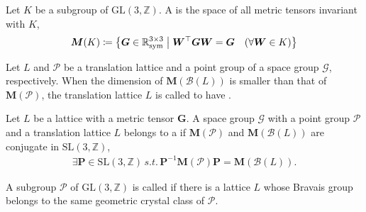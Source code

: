 \begin{screen}
  \begin{defn}
    Let $K$ be a subgroup of $\mathrm{GL}(3, \mathbb{Z})$.
    A  is the space of all metric tensors invariant with $K$,
    \begin{align}
      \bm{M}( K ) \coloneqq \left\{  \bm{G} \in \mathbb{R}^{3 \times 3}_{\mathrm{sym}}  \mathrel{}\middle|\mathrel{}  \bm{W}^{\top}\bm{G}\bm{W} = \bm{G} \quad (\forall \bm{W} \in K )  \right\}
    \end{align}
  \end{defn}
\end{screen}

Let $L$ and $\mathcal{P}$ be a translation lattice and a point group of a space group $\mathcal{G}$, respectively.
When the dimension of $\bm{M}(\mathcal{B}(L))$ is smaller than that of $\bm{M}(\mathcal{P})$, the translation lattice $L$ is called to have .


\begin{screen}
  \begin{defn}
    Let $L$ be a lattice with a metric tensor $\bm{G}$.
    A space group $\mathcal{G}$ with a point group $\mathcal{P}$ and a translation lattice $L$ belongs to a  if $\bm{M}(\mathcal{P})$ and $\bm{M}(\mathcal{B}(L))$ are conjugate in $\mathrm{SL}(3, \mathbb{Z})$,
    \begin{align}
      \exists \bm{P} \in \mathrm{SL}(3, \mathbb{Z}) \,s.t.\, \bm{P}^{-1} \bm{M}(\mathcal{P}) \bm{P} = \bm{M}(\mathcal{B}(L)).
    \end{align}
  \end{defn}
\end{screen}


\begin{screen}
  \begin{defn}[holohedry]
    A subgroup $\mathcal{P}$ of $\mathrm{GL}(3, \mathbb{Z})$ is called  if there is a lattice $L$ whose Bravais group belongs to the same geometric crystal class of $\mathcal{P}$.
  \end{defn}
\end{screen}

